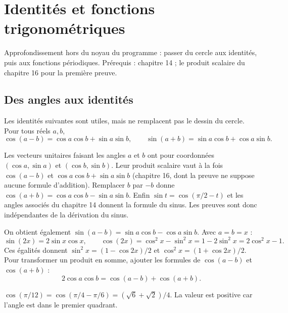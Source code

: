 \documentclass[../cours_1re.tex]{subfiles}
\begin{document}
\setcounter{chapter}{14}
\chapter{Identités et fonctions trigonométriques}
\label{ch:15}
\begin{objectif}
Approfondissement hors du noyau du programme : passer du cercle aux identités, puis aux fonctions périodiques. Prérequis : chapitre 14 ; le produit scalaire du chapitre 16 pour la première preuve.
\end{objectif}
\section{Des angles aux identités}
Les identités suivantes sont utiles, mais ne remplacent pas le dessin du cercle.
Pour tous réels $a,b$,
\[
\cos(a-b)=\cos a\cos b+\sin a\sin b,\qquad
\sin(a+b)=\sin a\cos b+\cos a\sin b.
\]
\begin{demonstration}
Les vecteurs unitaires faisant les angles $a$ et $b$ ont pour coordonnées
$(\cos a,\sin a)$ et $(\cos b,\sin b)$. Leur produit scalaire vaut à la fois
$\cos(a-b)$ et $\cos a\cos b+\sin a\sin b$ (chapitre 16, dont la preuve ne suppose
aucune formule d'addition). Remplacer $b$ par $-b$ donne
$\cos(a+b)=\cos a\cos b-\sin a\sin b$.
Enfin $\sin t=\cos(\pi/2-t)$ et les angles associés du chapitre 14 donnent
la formule du sinus. Les preuves sont donc indépendantes de la dérivation du sinus.
\end{demonstration}
On obtient également $\sin(a-b)=\sin a\cos b-\cos a\sin b$.
Avec $a=b=x$ :
\[
\sin(2x)=2\sin x\cos x,\qquad
\cos(2x)=\cos^2x-\sin^2x=1-2\sin^2x=2\cos^2x-1.
\]
Ces égalités donnent $\sin^2x=(1-\cos2x)/2$ et
$\cos^2x=(1+\cos2x)/2$. Pour transformer un produit en somme, ajouter
les formules de $\cos(a-b)$ et $\cos(a+b)$ :
\[
2\cos a\cos b=\cos(a-b)+\cos(a+b).
\]
\begin{exemple}
$\cos(\pi/12)=\cos(\pi/4-\pi/6)=(\sqrt6+\sqrt2)/4$.
La valeur est positive car l'angle est dans le premier quadrant.
\end{exemple}
\end{document}
